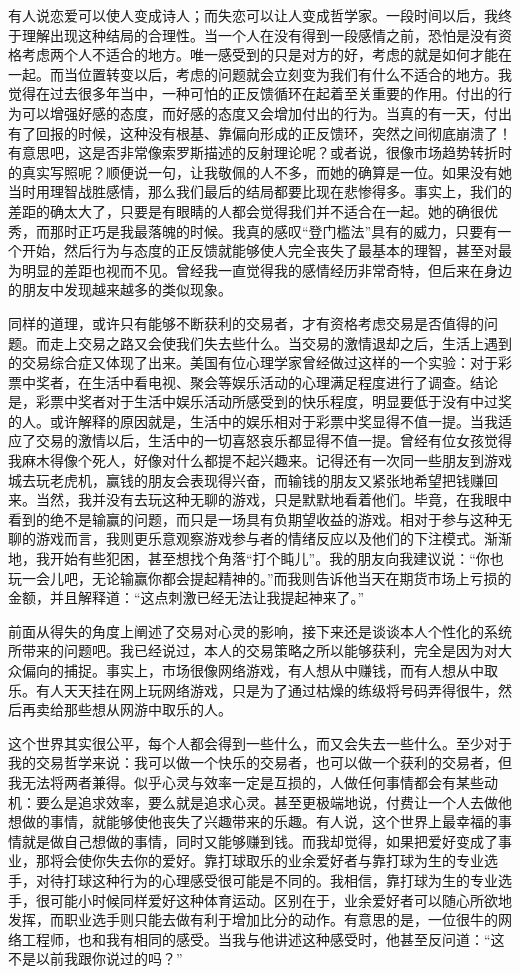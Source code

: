 有人说恋爱可以使人变成诗人；而失恋可以让人变成哲学家。一段时间以后，我终于理解出现这种结局的合理性。当一个人在没有得到一段感情之前，恐怕是没有资格考虑两个人不适合的地方。唯一感受到的只是对方的好，考虑的就是如何才能在一起。而当位置转变以后，考虑的问题就会立刻变为我们有什么不适合的地方。我觉得在过去很多年当中，一种可怕的正反馈循环在起着至关重要的作用。付出的行为可以增强好感的态度，而好感的态度又会增加付出的行为。当真的有一天，付出有了回报的时候，这种没有根基、靠偏向形成的正反馈环，突然之间彻底崩溃了！有意思吧，这是否非常像索罗斯描述的反射理论呢？或者说，很像市场趋势转折时的真实写照呢？顺便说一句，让我敬佩的人不多，而她的确算是一位。如果没有她当时用理智战胜感情，那么我们最后的结局都要比现在悲惨得多。事实上，我们的差距的确太大了，只要是有眼睛的人都会觉得我们并不适合在一起。她的确很优秀，而那时正巧是我最落魄的时候。我真的感叹“登门槛法”具有的威力，只要有一个开始，然后行为与态度的正反馈就能够使人完全丧失了最基本的理智，甚至对最为明显的差距也视而不见。曾经我一直觉得我的感情经历非常奇特，但后来在身边的朋友中发现越来越多的类似现象。

同样的道理，或许只有能够不断获利的交易者，才有资格考虑交易是否值得的问题。而走上交易之路又会使我们失去些什么。当交易的激情退却之后，生活上遇到的交易综合症又体现了出来。美国有位心理学家曾经做过这样的一个实验：对于彩票中奖者，在生活中看电视、聚会等娱乐活动的心理满足程度进行了调查。结论是，彩票中奖者对于生活中娱乐活动所感受到的快乐程度，明显要低于没有中过奖的人。或许解释的原因就是，生活中的娱乐相对于彩票中奖显得不值一提。当我适应了交易的激情以后，生活中的一切喜怒哀乐都显得不值一提。曾经有位女孩觉得我麻木得像个死人，好像对什么都提不起兴趣来。记得还有一次同一些朋友到游戏城去玩老虎机，赢钱的朋友会表现得兴奋，而输钱的朋友又紧张地希望把钱赚回来。当然，我并没有去玩这种无聊的游戏，只是默默地看着他们。毕竟，在我眼中看到的绝不是输赢的问题，而只是一场具有负期望收益的游戏。相对于参与这种无聊的游戏而言，我则更乐意观察游戏参与者的情绪反应以及他们的下注模式。渐渐地，我开始有些犯困，甚至想找个角落“打个盹儿”。我的朋友向我建议说：“你也玩一会儿吧，无论输赢你都会提起精神的。”而我则告诉他当天在期货市场上亏损的金额，并且解释道：“这点刺激已经无法让我提起神来了。”

前面从得失的角度上阐述了交易对心灵的影响，接下来还是谈谈本人个性化的系统所带来的问题吧。我已经说过，本人的交易策略之所以能够获利，完全是因为对大众偏向的捕捉。事实上，市场很像网络游戏，有人想从中赚钱，而有人想从中取乐。有人天天挂在网上玩网络游戏，只是为了通过枯燥的练级将号码弄得很牛，然后再卖给那些想从网游中取乐的人。

这个世界其实很公平，每个人都会得到一些什么，而又会失去一些什么。至少对于我的交易哲学来说：我可以做一个快乐的交易者，也可以做一个获利的交易者，但我无法将两者兼得。似乎心灵与效率一定是互损的，人做任何事情都会有某些动机：要么是追求效率，要么就是追求心灵。甚至更极端地说，付费让一个人去做他想做的事情，就能够使他丧失了兴趣带来的乐趣。有人说，这个世界上最幸福的事情就是做自己想做的事情，同时又能够赚到钱。而我却觉得，如果把爱好变成了事业，那将会使你失去你的爱好。靠打球取乐的业余爱好者与靠打球为生的专业选手，对待打球这种行为的心理感受很可能是不同的。我相信，靠打球为生的专业选手，很可能小时候同样爱好这种体育运动。区别在于，业余爱好者可以随心所欲地发挥，而职业选手则只能去做有利于增加比分的动作。有意思的是，一位很牛的网络工程师，也和我有相同的感受。当我与他讲述这种感受时，他甚至反问道：“这不是以前我跟你说过的吗？”

